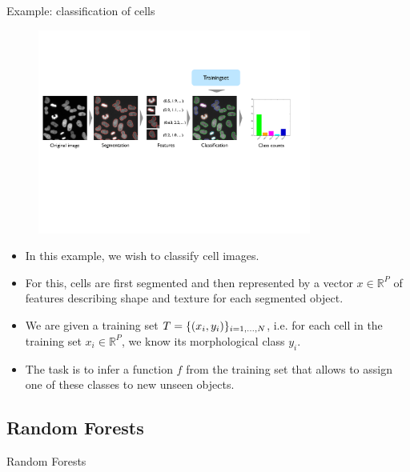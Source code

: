 \documentclass[xcolor=pdftex,dvipsnames,table]{beamer}
\begin{document}
\begin{frame}{Example: classification of cells}
\begin{figure}[htb]
\includegraphics[width=0.8\textwidth]{../graphics/ComputationalPhenotyping.pdf}
\end{figure}

\begin{itemize}
	\item In this example, we wish to classify cell images.
	\item For this, cells are first segmented and then represented by a vector $x \in \mathbb{R}^P$ of features describing shape and texture for each segmented object.
	\item We are given a training set $T = \{(x_i, y_i)\}_{i=1, \ldots, N}$, i.e. for each cell in the training set $x_i \in \mathbb{R}^P$, we know its morphological class $y_i$.
	\item The task is to infer a function $f$ from the training set that allows to assign one of these classes to new unseen objects.
\end{itemize}
\end{frame}

\subsection{Random Forests}
\begin{frame}[plain,c]
\begin{center}
\Huge Random Forests
\end{center}
\end{frame}
\end{document}
